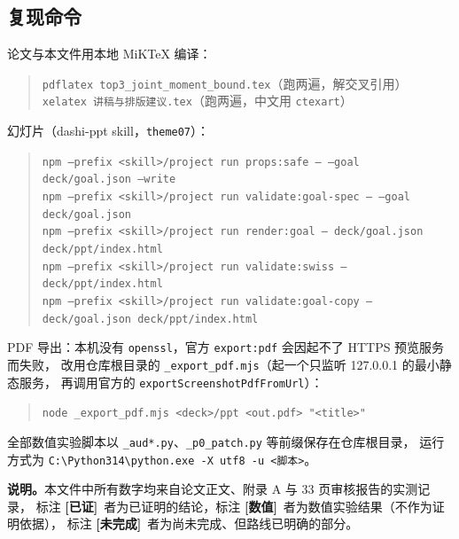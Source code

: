 \documentclass[UTF8,11pt]{ctexart}
\newcommand{\file}[1]{\texttt{#1}}
\newcommand{\ok}{\textcolor[rgb]{0.05,0.45,0.15}{\bfseries [已证]}}
\newcommand{\num}{\textcolor[rgb]{0.55,0.35,0.00}{\bfseries [数值]}}
\newcommand{\todo}{\textcolor[rgb]{0.70,0.15,0.10}{\bfseries [未完成]}}
\begin{document}
\subsection*{复现命令}
论文与本文件用本地 MiKTeX 编译：
\begin{quote}\small\raggedright
\file{pdflatex top3\_joint\_moment\_bound.tex}（跑两遍，解交叉引用）\\
\file{xelatex 讲稿与排版建议.tex}（跑两遍，中文用 \file{ctexart}）
\end{quote}
幻灯片（dashi-ppt skill，\file{theme07}）：
\begin{quote}\small\raggedright
\file{npm --prefix <skill>/project run props:safe -- --goal deck/goal.json --write}\\
\file{npm --prefix <skill>/project run validate:goal-spec -- --goal deck/goal.json}\\
\file{npm --prefix <skill>/project run render:goal -- deck/goal.json deck/ppt/index.html}\\
\file{npm --prefix <skill>/project run validate:swiss -- deck/ppt/index.html}\\
\file{npm --prefix <skill>/project run validate:goal-copy -- deck/goal.json deck/ppt/index.html}
\end{quote}
PDF 导出：本机没有 \file{openssl}，官方 \file{export:pdf} 会因起不了 HTTPS 预览服务而失败，
改用仓库根目录的 \file{\_export\_pdf.mjs}（起一个只监听 127.0.0.1 的最小静态服务，
再调用官方的 \file{exportScreenshotPdfFromUrl}）：
\begin{quote}\small\raggedright
\file{node \_export\_pdf.mjs <deck>/ppt <out.pdf> "<title>"}
\end{quote}
全部数值实验脚本以 \file{\_aud*.py}、\file{\_p0\_patch.py} 等前缀保存在仓库根目录，
运行方式为 \file{C:\textbackslash Python314\textbackslash python.exe -X utf8 -u <脚本>}。

\vspace{1em}
\noindent\textbf{说明。}本文件中所有数字均来自论文正文、附录 A 与 33 页审核报告的实测记录，
标注 \ok\ 者为已证明的结论，标注 \num\ 者为数值实验结果（不作为证明依据），
标注 \todo\ 者为尚未完成、但路线已明确的部分。
\end{document}
